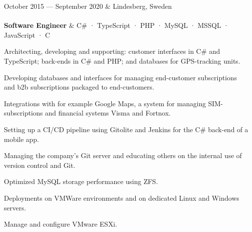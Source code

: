 \documentclass{cv-stylish}
\begin{document}
\begin{center}
\vspace{1em}
\begin{JobTable}
  October 2015 --- September 2020 & \hfill Lindesberg, Sweden \\[3pt]
   \\[3pt]
  \hspace{5mm} \textbf{Software Engineer}
  & \hfill C\# · TypeScript · PHP · MySQL · MSSQL · JavaScript · C \\
\end{JobTable}
\begin{adjustwidth}{0.015\linewidth}{0.015\linewidth}

\begin{compactitem}
  \item Architecting, developing and supporting: customer interfaces in
    C\# and TypeScript; back-ends in C\# and PHP; and databases for
    GPS-tracking units.
  \item Developing databases and interfaces for managing end-customer
    subscriptions and b2b subscriptions packaged to end-customers.
  \item Integrations with for example Google Maps, a system for managing
    SIM-subscriptions and financial systems Visma and Fortnox.
  \item Setting up a CI/CD pipeline using Gitolite and Jenkins for the C\#
    back-end of a mobile app.
  \item Managing the company's Git server and educating others on the
    internal use of version control and Git.
  \item Optimized MySQL storage performance using ZFS.
  \item Deployments on VMWare environments and on dedicated Linux and
    Windows servers.
  \item Manage and configure VMware ESXi.
\end{compactitem}
\end{adjustwidth}


\end{center}
\end{document}
